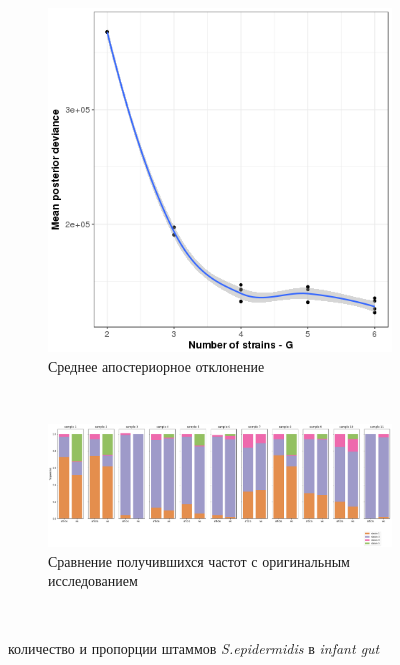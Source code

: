 \documentclass{spbau-diploma}
\begin{document}
\begin{figure}
    \centering
    \begin{subfigure}[b]{0.7\textwidth}
        \includegraphics[width=\textwidth]{pics/infant_gut_dev.png}
        \caption{Среднее апостериорное отклонение}
    \end{subfigure}
    ~ %
      
    \hfill
      
    \begin{subfigure}[b]{1.0\textwidth}
        \includegraphics[width=\textwidth]{pics/infant_gut_results.png}
        \caption{Сравнение получившихся частот с оригинальным исследованием}
    \end{subfigure}
    ~ %
    
    \caption{количество и пропорции штаммов \textit{S.epidermidis} в \textit{infant gut}}\label{infant_gut_figs}
\end{figure}
\end{document}
